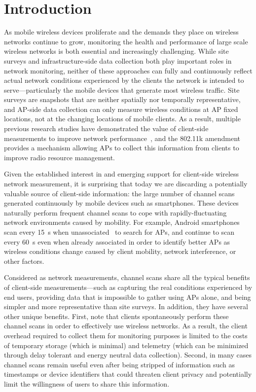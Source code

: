 \section{Introduction}
\label{sec-introduction}

As mobile wireless devices proliferate and the demands they place on wireless
networks continue to grow, monitoring the health and performance of large
scale wireless networks is both essential and increasingly challenging. While
site surveys and infrastructure-side data collection both play important
roles in network monitoring, neither of these approaches can fully and
continuously reflect actual network conditions experienced by the clients the
network is intended to serve---particularly the mobile devices that generate
most wireless traffic. Site surveys are snapshots that are neither spatially nor
temporally representative, and AP-side data collection can only
measure wireless conditions at AP fixed locations, not at the changing
locations of mobile clients. As a result, multiple previous research studies
have demonstrated the value of client-side measurements to improve network
performance~\cite{mishra2005weighted,mishra2006client}, and the 802.11k
amendment~\cite{80211k} provides a mechanism allowing APs to collect this
information from clients to improve radio resource management.

Given the established interest in and emerging support for client-side wireless
network measurement, it is surprising that today we are discarding a
potentially valuable source of client-side information: the large number of
channel scans generated continuously by mobile devices such as smartphones.
These devices naturally perform frequent channel scans to cope with
rapidly-fluctuating network environments caused by mobility. For example,
Android smartphones scan every 15~s when unassociated~\cite{hanover2014cutting}
to search for APs, and continue to scan every 60~s even when already associated in
order to identify better APs as wireless conditions change caused by client mobility,
network interference, or other factors.

Considered as network measurements, channel scans share all the typical benefits
of client-side measurements---such as capturing the real conditions experienced
by end users, providing data that is impossible to gather using APs alone, and
being simpler and more representative than site surveys. In addition, they have
several other unique benefits. First, note that clients spontaneously perform
these channel scans in order to effectively use wireless networks. As a result,
the client overhead required to collect them for monitoring purposes is limited
to the costs of temporary storage (which is minimal) and telemetry (which can be
minimized through delay tolerant and energy neutral data collection). Second, in
many cases channel scans remain useful even after being stripped of information
such as timestamps or device identifiers that could threaten client privacy and
potentially limit the willingness of users to share this information.

